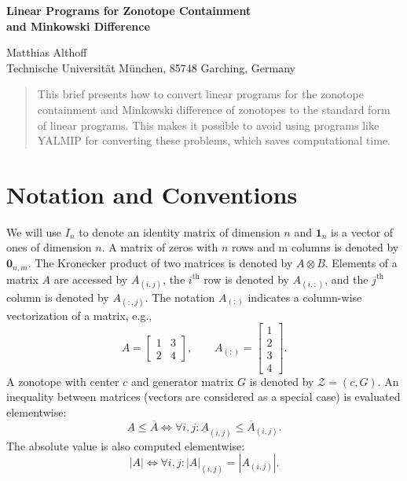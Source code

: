 \documentclass[10pt,a4paper]{article}
\renewcommand{\^}[1]{^{(#1)}}
\renewcommand{\th}[1]{#1^\text{th}}
\begin{document}
\mbox{} \vspace{0.8cm} \mbox{}
\begin{center} {\huge\textbf{Linear Programs for Zonotope Containment \\[0.2cm] and Minkowski Difference}} \end{center}
\vspace{0.2cm}
\begin{center} {\large Matthias Althoff} \\[0.2cm] Technische Universit\"at M\"unchen, 85748 Garching, Germany
\end{center}
\vspace{0.2cm}



\begin{abstract}
 This brief presents how to convert linear programs for the zonotope containment and Minkowski difference of zonotopes to the standard form of linear programs. This makes it possible to avoid using programs like YALMIP for converting these problems, which saves computational time.
\end{abstract}


\section{Notation and Conventions}

We will use $I_n$ to denote an identity matrix of dimension $n$ and $\mathbf{1}_n$ is a vector of ones of dimension $n$. A matrix of zeros with $n$ rows and m columns is denoted by $\mathbf{0}_{n,m}$. The Kronecker product of two matrices is denoted by $A \otimes B$. Elements of a matrix $A$ are accessed by $A_{(i,j)}$, the $\th{i}$ row is denoted by $A_{(i,:)}$, and the $\th{j}$ column is denoted by $A_{(:,j)}$. The notation $A_{(:)}$ indicates a column-wise vectorization of a matrix, e.g., 
\begin{equation*}
 A =
 \begin{bmatrix}
  1 & 3 \\ 2 & 4
 \end{bmatrix}, \qquad
 A_{(:)} = \begin{bmatrix} 1 \\ 2 \\ 3 \\ 4 \end{bmatrix}.
\end{equation*}
A zonotope with center $c$ and generator matrix $G$ is denoted by $\mathcal{Z}=(c,G)$. An inequality between matrices (vectors are considered as a special case) is evaluated elementwise:
\begin{equation*}
 \underline{A} \leq \overline {A} \Leftrightarrow \forall i,j: \underline{A}_{(i,j)} \leq \overline {A}_{(i,j)}.
\end{equation*}
The absolute value is also computed elementwise:
\begin{equation*}
 |A| \Leftrightarrow \forall i,j: |A|_{(i,j)} = |A_{(i,j)}|.
\end{equation*}
\end{document}
